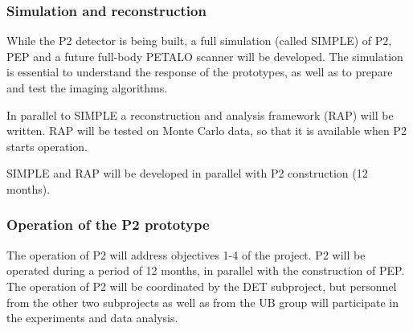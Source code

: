 

\subsubsection*{Simulation and reconstruction}
While the P2 detector is being built, a full simulation (called SIMPLE) of P2, PEP and a future full-body PETALO scanner will be developed. The simulation is essential to understand the response of the prototypes, as well as to prepare and test the imaging algorithms.

In parallel to SIMPLE a reconstruction and analysis framework (RAP) will be written. RAP will be tested on Monte Carlo data, so that it is available when P2 starts operation. 


SIMPLE and RAP will be developed in parallel with P2 construction (12 months).  

\subsubsection*{Operation of the P2 prototype}
The operation of P2 will address objectives 1-4 of the project. P2 will be operated during a period of 12 months, in parallel with the construction of PEP. The operation of P2 will be coordinated by the DET subproject, but personnel from the other two subprojects as well as from the UB group will participate in the experiments and data analysis. 

